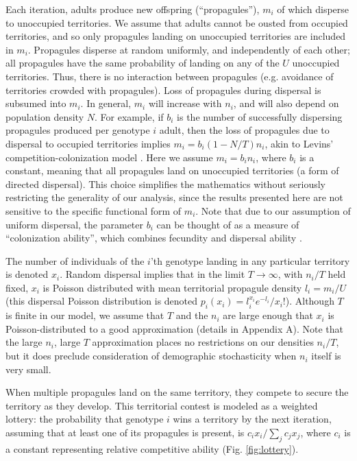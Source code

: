 \documentclass[11pt]{article}
\begin{document}
Each iteration, adults produce new offspring (``propagules''), $m_i$ of which disperse to unoccupied territories. We assume that adults cannot be ousted from occupied territories, and so only propagules landing on unoccupied territories are included in $m_i$. Propagules disperse at random uniformly, and independently of each other; all propagules have the same probability of landing on any of the $U$ unoccupied territories. Thus, there is no interaction between propagules (e.g. avoidance of territories crowded with propagules). Loss of propagules during dispersal is subsumed into $m_i$. In general, $m_i$ will increase with $n_i$, and will also depend on population density $N$. For example, if $b_i$ is the number of successfully dispersing propagules produced per genotype $i$ adult, then the loss of propagules due to dispersal to occupied territories implies $m_i=b_i(1-N/T)n_i$, akin to Levins' competition-colonization model \citep{levins_71,tilman_94}. Here we assume $m_i=b_i n_i$, where $b_i$ is a constant, meaning that all propagules land on unoccupied territories (a form of directed dispersal). This choice simplifies the mathematics without seriously restricting the generality of our analysis, since the results presented here are not sensitive to the specific functional form of $m_i$. Note that due to our assumption of uniform dispersal, the parameter $b_i$ can be thought of as a measure of ``colonization ability'', which combines fecundity and dispersal ability \citep{levins_71,tilman_94,bolker_99}. 

The number of individuals of the $i$'th genotype landing in any particular territory is denoted $x_i$. Random dispersal implies that in the limit $T\rightarrow \infty$, with $n_i/T$ held fixed, $x_i$ is Poisson distributed with mean territorial propagule density $l_i=m_i/U$ (this dispersal Poisson distribution is denoted $p_i(x_i)=l_i^{x_i} e^{-l_i}/x_i!$). Although $T$ is finite in our model, we assume that $T$ and the $n_i$ are large enough that $x_i$ is Poisson-distributed to a good approximation (details in Appendix A). Note that the large $n_i$, large $T$ approximation places no restrictions on our densities $n_i/T$, but it does preclude consideration of demographic stochasticity when $n_i$ itself is very small.

When multiple propagules land on the same territory, they compete to secure the territory as they develop. This territorial contest is modeled as a weighted lottery: the probability that genotype $i$ wins a territory by the next iteration, assuming that at least one of its propagules is present, is $c_i x_i/\sum_j c_j x_j$, where $c_i$ is a constant representing relative competitive ability (Fig. \ref{fig:lottery}). 
\end{document}
